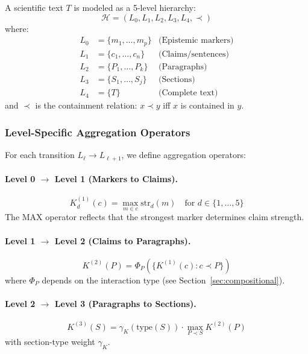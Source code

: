 \begin{termbox}
A scientific text $T$ is modeled as a 5-level hierarchy:
\begin{equation}
\mathcal{H} = (L_0, L_1, L_2, L_3, L_4, \prec)
\end{equation}
where:
\begin{align*}
L_0 &= \{m_1, \ldots, m_p\} & \text{(Epistemic markers)} \\
L_1 &= \{c_1, \ldots, c_n\} & \text{(Claims/sentences)} \\
L_2 &= \{P_1, \ldots, P_k\} & \text{(Paragraphs)} \\
L_3 &= \{S_1, \ldots, S_j\} & \text{(Sections)} \\
L_4 &= \{T\} & \text{(Complete text)}
\end{align*}
and $\prec$ is the containment relation: $x \prec y$ iff $x$ is contained in $y$.
\end{termbox}

\subsubsection{Level-Specific Aggregation Operators}

For each transition $L_\ell \rightarrow L_{\ell+1}$, we define aggregation operators:

\paragraph{Level 0 $\rightarrow$ Level 1 (Markers to Claims).}
\begin{equation}
K^{(1)}_d(c) = \max_{m \in c} \text{str}_d(m) \quad \text{for } d \in \{1,\ldots,5\}
\end{equation}
The MAX operator reflects that the strongest marker determines claim strength.

\paragraph{Level 1 $\rightarrow$ Level 2 (Claims to Paragraphs).}
\begin{equation}
K^{(2)}(P) = \Phi_P\left(\{K^{(1)}(c) : c \prec P\}\right)
\end{equation}
where $\Phi_P$ depends on the interaction type (see Section~\ref{sec:compositional}).

\paragraph{Level 2 $\rightarrow$ Level 3 (Paragraphs to Sections).}
\begin{equation}
K^{(3)}(S) = \gamma_K(\text{type}(S)) \cdot \max_{P \prec S} K^{(2)}(P)
\end{equation}
with section-type weight $\gamma_K$.

